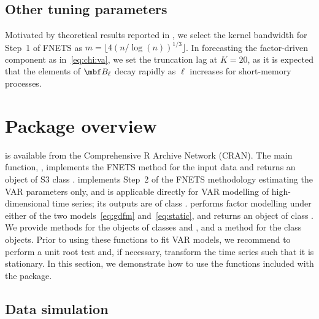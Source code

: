 \subsection{Other tuning parameters}

Motivated by theoretical results reported in \cite{barigozzi2022fnets}, we select the kernel bandwidth for Step~1 of FNETS as $m = \lfloor 4 (n/\log(n))^{1/3} \rfloor$.
In forecasting the factor-driven component as in~\eqref{eq:chi:va}, we set the truncation lag at $K = 20$, as it is expected that the elements of $\mbf B_\ell$ decay rapidly as $\ell$ increases for short-memory processes. 

\section{Package overview} 
\label{sec:package}

 is available from the Comprehensive R Archive Network (CRAN).
The main function, , implements the FNETS method for the input data and returns an object of S3 class .
 implements Step~2 of the FNETS methodology estimating the VAR parameters only, and is applicable directly for VAR modelling of high-dimensional time series; its outputs are of class .
 performs factor modelling under either of the two models~\eqref{eq:gdfm} and~\eqref{eq:static}, and returns an object of class .
We provide  methods for the objects of classes  and , and a  method for the  class objects. 
Prior to using these functions to fit VAR models, we recommend to perform a unit root test and, if necessary, transform the time series such that it is stationary.
In this section, we demonstrate how to use the functions included with the package.

\subsection{Data simulation}
\label{sec:package:data}

